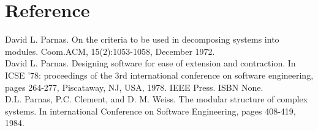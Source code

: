 \documentclass[12pt]{article}
\begin{document}
\section*{Reference}
David L. Parnas. On the criteria to be used in decomposing systems 
into modules. Coom.ACM, 15(2):1053-1058, December 1972.\\
David L. Parnas. Designing software for ease of extension and contraction. In ICSE '78: proceedings of the 3rd international conference on software engineering, pages 264-277, Piscataway, NJ, USA, 1978. IEEE Press. ISBN None.\\
D.L. Parnas, P.C. Clement, and D. M. Weiss. The modular structure
of complex systems. In international Conference on Software Engineering, pages 408-419, 1984.
\end{document}
